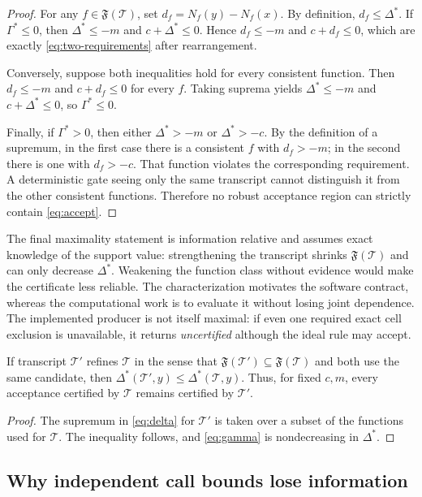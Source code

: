 \documentclass[smallextended]{svjour3}
\newcommand{\cT}{\mathcal{T}}
\begin{document}
\begin{proof}
For any $f\in\mathfrak F(\cT)$, set
$d_f=N_f(y)-N_f(x)$.  By definition, $d_f\leq\Delta^*$.  If
$\Gamma^*\leq0$, then $\Delta^*\leq-m$ and
$c+\Delta^*\leq0$.  Hence $d_f\leq-m$ and $c+d_f\leq0$, which are exactly
\eqref{eq:two-requirements} after rearrangement.

Conversely, suppose both inequalities hold for every consistent function.
Then $d_f\leq-m$ and $c+d_f\leq0$ for every $f$.  Taking suprema yields
$\Delta^*\leq-m$ and $c+\Delta^*\leq0$, so $\Gamma^*\leq0$.

Finally, if $\Gamma^*>0$, then either $\Delta^*>-m$ or
$\Delta^*>-c$.  By the definition of a supremum, in the first case there is a
consistent $f$ with $d_f>-m$; in the second there is one with $d_f>-c$.
That function violates the corresponding requirement.  A deterministic gate
seeing only the same transcript cannot distinguish it from the other
consistent functions.  Therefore no robust acceptance region can strictly
contain \eqref{eq:accept}.
\end{proof}

The final maximality statement is information relative and assumes exact
knowledge of the support value: strengthening the
transcript shrinks $\mathfrak F(\cT)$ and can only decrease $\Delta^*$.
Weakening the function class without evidence would make the certificate less
reliable.  The characterization motivates the software contract, whereas the
computational work is to evaluate it without losing joint dependence.
The implemented producer is not itself maximal: if even one required exact
cell exclusion is unavailable, it returns \emph{uncertified} although the
ideal rule may accept.

\begin{proposition}
\label{prop:information}
If transcript $\cT'$ refines $\cT$ in the sense that
$\mathfrak F(\cT')\subseteq\mathfrak F(\cT)$ and both use the same candidate,
then $\Delta^*(\cT',y)\leq\Delta^*(\cT,y)$.  Thus, for fixed $c,m$, every
acceptance certified by $\cT$ remains certified by $\cT'$.
\end{proposition}

\begin{proof}
The supremum in \eqref{eq:delta} for $\cT'$ is taken over a subset of the
functions used for $\cT$.  The inequality follows, and \eqref{eq:gamma} is
nondecreasing in $\Delta^*$.
\end{proof}

\subsection{Why independent call bounds lose information}
\end{document}
